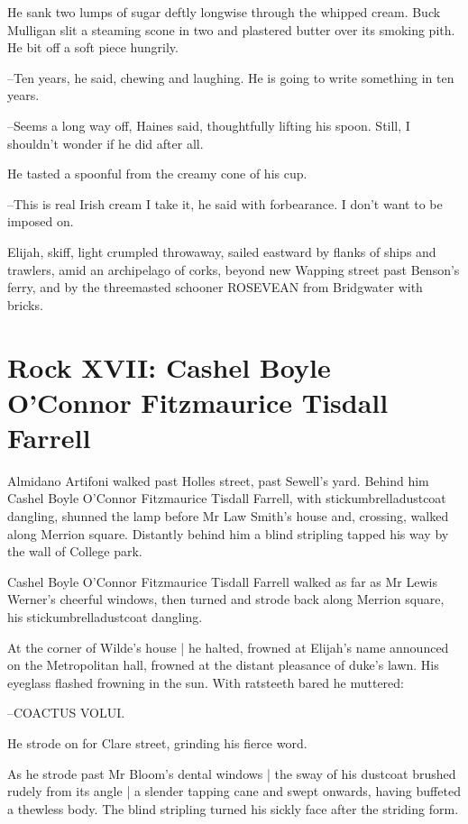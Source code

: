 He sank two lumps of sugar deftly longwise
through the whipped
cream.
Buck Mulligan slit a steaming scone in two
and plastered butter
over its smoking pith.
He bit off a soft piece hungrily.

--Ten years,
he said,
chewing and laughing.
He is going to write something in ten years.%

--Seems a long way off,
Haines said,
thoughtfully lifting his spoon.
Still, I shouldn't wonder if he did after all.

He tasted a spoonful from the creamy cone of his cup.

--This is real Irish cream I take it,
he said with forbearance.
I don't want to be imposed on.

Elijah,
skiff,
light crumpled throwaway,
sailed eastward by flanks of
ships and trawlers,
amid an archipelago of corks,
beyond new Wapping
street
past Benson's ferry,
and by the threemasted schooner ROSEVEAN from
Bridgwater with bricks.


\section*{Rock XVII: Cashel Boyle O'Connor Fitzmaurice Tisdall Farrell}


Almidano Artifoni walked past Holles street,
past Sewell's yard.
Behind him
Cashel Boyle O'Connor Fitzmaurice Tisdall Farrell,
with
stickumbrelladustcoat dangling,
shunned the lamp before Mr Law Smith's
house
and, crossing, walked along Merrion square.
Distantly behind him a
blind stripling
tapped his way by the wall of College park.

Cashel Boyle O'Connor Fitzmaurice Tisdall Farrell
walked as far as
Mr Lewis Werner's cheerful windows,
then turned and strode back along
Merrion square,
his stickumbrelladustcoat dangling.

At the corner of Wilde's house |
he halted,
frowned at Elijah's name announced on the Metropolitan hall,
frowned at the distant pleasance of duke's lawn.
His eyeglass flashed frowning in the sun.
With ratsteeth bared he muttered:

--COACTUS VOLUI.

He strode on for Clare street,
grinding his fierce word.

As he strode past Mr Bloom's dental windows |
the sway of his dustcoat brushed rudely from its angle |
a slender tapping cane and swept onwards,
having buffeted a thewless body.
The blind stripling turned his sickly face after the striding form.


